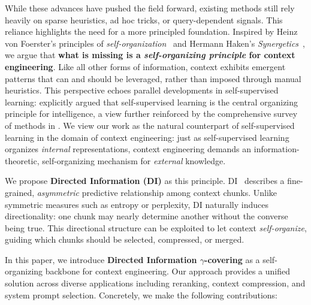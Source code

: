 \documentclass{article} %
\theoremstyle{definition}
\begin{document}
While these advances have pushed the field forward, existing methods still rely heavily on sparse heuristics, ad hoc tricks, or query-dependent signals. This reliance highlights the need for a more principled foundation. Inspired by Heinz von Foerster’s principles of \emph{self-organization}~\citep{vonfoerster1962selforganization} and Hermann Haken’s \emph{Synergetics}~\citep{haken1977synergetics}, we argue that \textbf{what is missing is a \emph{self-organizing principle} for context engineering}. Like all other forms of information, context exhibits emergent patterns that can and should be leveraged, rather than imposed through manual heuristics. This perspective echoes parallel developments in self-supervised learning: \citet{lecun2022path} explicitly argued that self-supervised learning is the central organizing principle for intelligence, a view further reinforced by the comprehensive survey of methods in \citet{balestriero2023cookbook}. We view our work as the natural counterpart of self-supervised learning in the domain of context engineering: just as self-supervised learning organizes \emph{internal} representations, context engineering demands an information-theoretic, self-organizing mechanism for \emph{external} knowledge.

We propose \textbf{Directed Information (DI)} as this principle. DI~\citep{massey1990causality,kim2008coding} describes a fine-grained, \emph{asymmetric} predictive relationship among context chunks. Unlike symmetric measures such as entropy or perplexity, DI naturally induces directionality: one chunk may nearly determine another without the converse being true. This directional structure can be exploited to let context \emph{self-organize}, guiding which chunks should be selected, compressed, or merged.

In this paper, we introduce \textbf{Directed Information $\gamma$-covering} as a self-organizing backbone for context engineering. Our approach provides a unified solution across diverse applications including reranking, context compression, and system prompt selection. Concretely, we make the following contributions:
\end{document}
